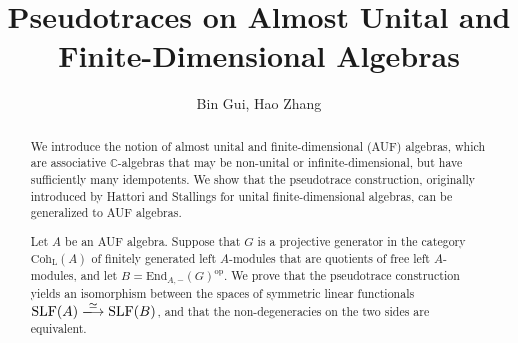 \documentclass[11pt,b5paper,notitlepage]{article}
\title{Pseudotraces on Almost Unital and Finite-Dimensional Algebras}
\author{{\sc Bin Gui, Hao Zhang}
}
\date{}
\theoremstyle{definition}
\theoremstyle{plain}
\newcommand{\End}{\mathrm{End}} %
\newcommand{\opp}{\mathrm{op}}
\newcommand{\Cbb}{\mathbb C}
\newcommand{\Coh}{\mathrm{Coh}_{\mathrm L}}
\newcommand{\SLF}{\mathrm{SLF}}
\numberwithin{equation}{section}
\begin{document}
\sloppy %
	\setcounter{page}{1}
	\setcounter{section}{-1}



	









	
	\maketitle











	


\normalsize


\begin{abstract}
We introduce the notion of almost unital and finite-dimensional (AUF) algebras, which are associative $\Cbb$-algebras that may be non-unital or infinite-dimensional, but have sufficiently many idempotents. We show that the pseudotrace construction, originally introduced by Hattori and Stallings for unital finite-dimensional algebras, can be generalized to AUF algebras. 

Let $A$ be an AUF algebra. Suppose that $G$ is a projective generator in the category $\Coh(A)$ of finitely generated left $A$-modules that are quotients of free left $A$-modules, and let $B = \End_{A,-}(G)^\opp$. We prove that the pseudotrace construction yields an isomorphism between the spaces of symmetric linear functionals $\SLF(A)\xlongrightarrow{\simeq} \SLF(B)$, and that the non-degeneracies on the two sides are equivalent.
\end{abstract}
\end{document}
